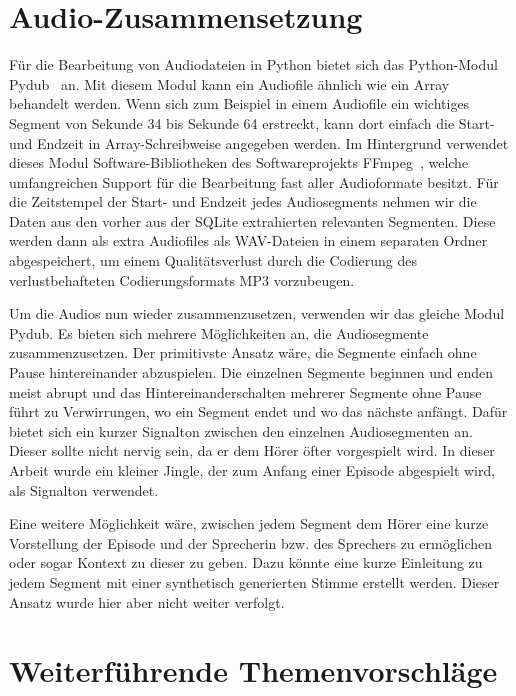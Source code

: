 \section{Audio-Zusammensetzung}

Für die Bearbeitung von Audiodateien in Python bietet sich das Python-Modul Pydub~\cite{zotero-567} an.
Mit diesem Modul kann ein Audiofile ähnlich wie ein Array behandelt werden.
Wenn sich zum Beispiel in einem Audiofile ein wichtiges Segment von Sekunde 34 bis Sekunde 64 erstreckt, kann dort einfach die Start- und Endzeit in Array-Schreibweise angegeben werden.
Im Hintergrund verwendet dieses Modul Software-Bibliotheken des Softwareprojekts FFmpeg~\cite{ffmpeg}, welche umfangreichen Support für die Bearbeitung fast aller Audioformate besitzt.
Für die Zeitstempel der Start- und Endzeit jedes Audiosegments nehmen wir die Daten aus den vorher aus der SQLite extrahierten relevanten Segmenten.
Diese werden dann als extra Audiofiles als WAV-Dateien in einem separaten Ordner abgespeichert, um einem Qualitätsverlust durch die Codierung des verlustbehafteten Codierungsformats MP3 vorzubeugen.

Um die Audios nun wieder zusammenzusetzen, verwenden wir das gleiche Modul Pydub.
Es bieten sich mehrere Möglichkeiten an, die Audiosegmente zusammenzusetzen.
Der primitivste Ansatz wäre, die Segmente einfach ohne Pause hintereinander abzuspielen.
Die einzelnen Segmente beginnen und enden meist abrupt und das Hintereinanderschalten mehrerer Segmente ohne Pause führt zu Verwirrungen, wo ein Segment endet und wo das nächste anfängt.
Dafür bietet sich ein kurzer Signalton zwischen den einzelnen Audiosegmenten an.
Dieser sollte nicht nervig sein, da er dem Hörer öfter vorgespielt wird.
In dieser Arbeit wurde ein kleiner Jingle, der zum Anfang einer Episode abgespielt wird, als Signalton verwendet.

Eine weitere Möglichkeit wäre, zwischen jedem Segment dem Hörer eine kurze Vorstellung der Episode und der Sprecherin bzw. des Sprechers zu ermöglichen oder sogar Kontext zu dieser zu geben.
Dazu könnte eine kurze Einleitung zu jedem Segment mit einer synthetisch generierten Stimme erstellt werden.
Dieser Ansatz wurde hier aber nicht weiter verfolgt.

\section{Weiterführende Themenvorschläge}

